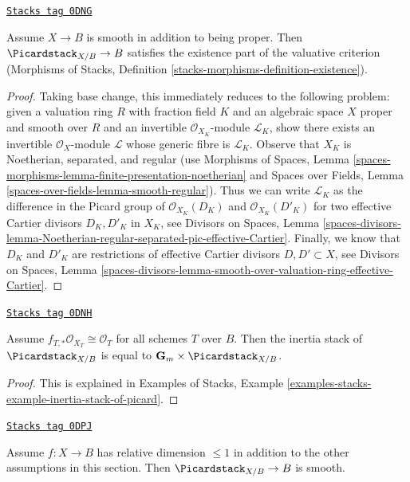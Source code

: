 \begin{lemma}
\label{moduli-lemma-pic-existence-part}
\href{https://stacks.math.columbia.edu/tag/0DNG}{\texttt{Stacks tag 0DNG}}

Assume $X \to B$ is smooth in addition to being proper.
Then $\Picardstack_{X/B} \to B$ satisfies the existence part
of the valuative criterion (Morphisms of Stacks, Definition
\ref{stacks-morphisms-definition-existence}).
\end{lemma}

\begin{proof}
Taking base change, this immediately reduces to the following
problem: given a valuation ring $R$ with fraction field $K$ and
an algebraic space $X$ proper and smooth over $R$ and an invertible
$\mathcal{O}_{X_K}$-module $\mathcal{L}_K$, show there exists
an invertible $\mathcal{O}_X$-module $\mathcal{L}$
whose generic fibre is $\mathcal{L}_K$.
Observe that $X_K$ is Noetherian, separated, and regular
(use Morphisms of Spaces, Lemma
\ref{spaces-morphisms-lemma-finite-presentation-noetherian}
and
Spaces over Fields, Lemma \ref{spaces-over-fields-lemma-smooth-regular}).
Thus we can write
$\mathcal{L}_K$ as the difference in the Picard group of
$\mathcal{O}_{X_K}(D_K)$ and $\mathcal{O}_{X_K}(D'_K)$
for two effective Cartier divisors $D_K, D'_K$ in $X_K$, see
Divisors on Spaces, Lemma
\ref{spaces-divisors-lemma-Noetherian-regular-separated-pic-effective-Cartier}.
Finally, we know that $D_K$ and $D'_K$ are restrictions of
effective Cartier divisors $D, D' \subset X$, see
Divisors on Spaces, Lemma
\ref{spaces-divisors-lemma-smooth-over-valuation-ring-effective-Cartier}.
\end{proof}

\begin{lemma}
\label{moduli-lemma-pic-inertia}
\href{https://stacks.math.columbia.edu/tag/0DNH}{\texttt{Stacks tag 0DNH}}

Assume $f_{T, *}\mathcal{O}_{X_T} \cong \mathcal{O}_T$ for all
schemes $T$ over $B$. Then the inertia stack of $\Picardstack_{X/B}$
is equal to $\mathbf{G}_m \times \Picardstack_{X/B}$.
\end{lemma}

\begin{proof}
This is explained in Examples of Stacks, Example
\ref{examples-stacks-example-inertia-stack-of-picard}.
\end{proof}

\begin{lemma}
\label{moduli-lemma-pic-curves-smooth}
\href{https://stacks.math.columbia.edu/tag/0DPJ}{\texttt{Stacks tag 0DPJ}}

Assume $f : X \to B$ has relative dimension $\leq 1$ in addition to
the other assumptions in this section. Then $\Picardstack_{X/B} \to B$
is smooth.
\end{lemma}

